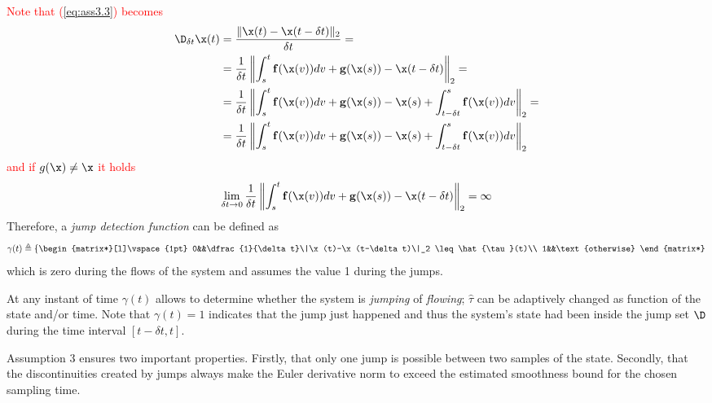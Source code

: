\textcolor{red}{
Note that (\ref{eq:ass3.3}) becomes
%
\begin{align}
     \D_{\delta t} \x(t) &= \frac{\|\x(t)-\x(t-\delta t)\|_2}{\delta t} =\\
                         &= \dfrac{1}{\delta t}\left\|\int_s^t\mathbf{\mathbf{f}}(\x(v))dv + \mathbf{g}(\x(s))-\x(t-\delta t)\right\|_2 =\\
                         &= \dfrac{1}{\delta t}\left\|\int_s^t\mathbf{\mathbf{f}}(\x(v))dv + \mathbf{g}(\x(s))-\x(s) + \int_{t-\delta t}^s\mathbf{\mathbf{f}}(\x(v))dv\right\|_2 = \\
                         &= \dfrac{1}{\delta t}\left\|\int_s^t\mathbf{\mathbf{f}}(\x(v))dv + \mathbf{g}(\x(s))-\x(s) + \int_{t-\delta t}^s\mathbf{\mathbf{f}}(\x(v))dv\right\|_2
\end{align}
%
and if $g(\x)\neq \x$ it holds
%
\begin{equation}
    \lim_{\delta t\rightarrow 0} \dfrac{1}{\delta t}\left\|\int_s^t\mathbf{\mathbf{f}}(\x(v))dv + \mathbf{g}(\x(s))-\x(t-\delta t)\right\|_2 = \infty
\end{equation}
%
}
%
Therefore, a \textit{jump detection function} can be defined as
%
\begin{equation}
    \gamma(t)\triangleq \left\{ 
        \begin{matrix*}[l]\vspace{1pt}
            0&&\dfrac{1}{\delta t}\|\x(t)-\x(t-\delta t)\|_2 \leq \hat{\tau}(t)\\
            1&&\text{otherwise}
        \end{matrix*}
    \right.
\end{equation}
%	
which is zero during the flows of the system and assumes the value 1 during the jumps.

At any instant of time $\gamma(t)$ allows to determine whether the system is \textit{jumping} of \textit{flowing};
 $\hat{\tau}$ can be adaptively changed as function of the state and/or time.
Note that $\gamma(t)=1$ indicates that the jump just happened and thus the system's state had been inside the jump set $\D$ during the time interval $[t-\delta t,t]$.
%
\begin{rem}
    Assumption 3 ensures two important properties. Firstly, that only one jump is possible between two samples of the state. Secondly, that the discontinuities created by jumps always make the Euler derivative norm to exceed the estimated smoothness bound for the chosen sampling time. 
\end{rem}
%
\clearpage
